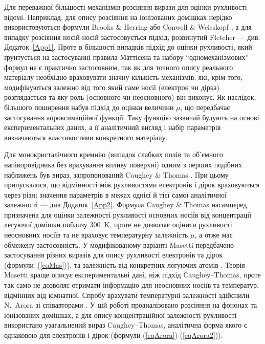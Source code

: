\documentclass[fleqn,twoside,twocolumn,nofootinbib,showkeys]{revtex4} %
\begin{document}
Для переважної більшості механізмів розсіяння вирази для оцінки рухливості відомі.
Наприклад, для опису розсіяння на іонізованих домішках нерідко використовуються формули Brooks \& Herring
або Conwell \& Weisskopf \cite{Hamaguchi2023,Seeger2004,Boeer2023}, а для випадку розсіяння носій-носій  застосовується підхід, розвинутий Fletcher \cite{Bourbaba2025,Fletcher1957}
--- див. Додаток~\ref{App1}.
Проте в більшості випадків підхід до оцінки рухливості,
який ґрунтується на застосуванні правила Маттісена та набору ``одномеханізмових'' формул не є
практично застосовним, так як для точного опису реального матеріалу необхідно враховувати значну кількість механізмів, які, крім того,
модифікуються залежно від того який саме носії (електрон чи дірка) розглядається та яку роль (основного чи неосновного) він виконує.
Як наслідок, більшого поширення набув підхід до оцінки величини $\mu$,
що передбачає застосування апроксимаційної функції.
Таку функцію зазвичай будують на основі експериментальних даних, а її аналітичний вигляд і набір параметрів визначаються властивостями конкретного матеріалу.

Для монокристалічного кремнію (випадок слабких полів та об'ємного напівпровідника без врахування впливу поверхні) одним
з перших подібних наближень був вираз, запропонований   Caughey \& Thomas \cite{Rudra2024,Caughey1967}.
При цьому припускалося, що відмінності між рухливостями електронів і дірок враховуються через різні значення параметрів
в межах однієї й тієї самої аналітичної залежності --- див Додаток~\ref{App2}.
Формула Caughey \& Thomas насамперед призначена для оцінки залежності рухливості основних носіїв від концентрації легуючої домішки поблизу 300~K,
проте не дозволяє оцінити рухливості неосновних носіїв та не враховує температурну залежність $\mu$, а отже має обмежену застосовність.
У модифікованому варіанті Masetti передбачено застосування різних виразів для опису рухливості електронів та дірок (формули~(\ref{eqMas})),
та залежність від конкретних легуючих атомів \cite{Masetti1983, Berrada2020}.
Теорія Masetti краще описує експериментальні дані, ніж підхід  Caughey--Thomas, проте так само не дозволяє отримати інформацію для неосновних носіїв та
температур, відмінних від кімнатної.
Спробу врахувати температурні залежності здійснили N.~Arora зі співавторами \cite{Arora1982}.
У цій роботі проаналізовано розсіяння на фононах та іонізованих домішках,
а для опису концентраційної залежності рухливості використано узагальнений вираз Caughey–Thomas,
аналітична форма якого є однаковою для електронів і дірок (формули (\ref{eqArora})-(\ref{eqArora2})).
\end{document}
